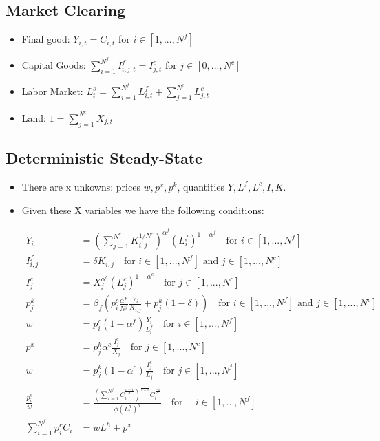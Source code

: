 \documentclass[11pt]{article}
\numberwithin{equation}{section}
\begin{document}
\subsection{Market Clearing}

\begin{itemize}
	\item Final good: $Y_{i,t} = C_{i,t}$ for $i \in [1,...,N^f]$
	\item Capital Goods: $\sum_{i=1}^{N^f} I^f_{i,j,t} = I^c_{j,t}$ for $j \in [0,...,N^c]$
	\item Labor Market: $L^s_{t}= \sum_{i=1}^{N^f} L^f_{i,t} +  \sum_{j=1}^{N^c} L^c_{j,t}$
	\item Land: $1 = \sum_{j=1}^{N^c} X_{j,t}$
\end{itemize}

\subsection{Deterministic Steady-State}
\begin{itemize}
	\item There are x unkowns: prices $w,p^x,p^k$, quantities $Y, L^f, L^c, I, K$.
	
	\item Given these X variables we have the following conditions: 
	
	\begin{align*}
Y_i & =  \left( \sum_{j=1}^{N^c } K^{1/N^c}_{i,j}\right)^{\alpha^f} \left(L_i^f\right)^{1-\alpha^f}  \quad \text{for }i \in [1,...,N^f]\\
I^f_{i,j} & = \delta K_{i,j}  \quad \text{for } i \in [1,...,N^f]  \text{ and } j \in [1,...,N^c]  \\
I^c_{j} & = X^{\alpha^c}_j \left(L^c_j\right)^{1-\alpha^c} \quad \text{for } j \in [1,...,N^c] \\ 
p^k_{j} & =\beta_f \left( p^c_{i} \frac{\alpha^F}{N^f} \frac{Y_{i}}{K_{i,j}} +  p^k_{j} (1-\delta) \right)  \quad \text{for } i \in [1,...,N^f]  \text{ and } j \in [1,...,N^c] \\
w & = p^c_{i} (1-\alpha^f) \frac{Y_{i}}{ L^f_{i}}  \quad \text{for }i \in [1,...,N^f] \\
p^x & = p^k_{j} \alpha^c \frac{I^c_{j}}{X_{j}}  \quad \text{for } j \in [1,...,N^c] \\
w & =  p^k_{j} (1-\alpha^c) \frac{I^c_{j}}{L^c_{j}}  \quad \text{for } j \in [1,...,N^j]\\
\frac{p^c_{i}}{w} & = \frac{\left( \sum_{i=1}^{N^f} C_i^{\frac{\sigma-1}{\sigma}} \right)^{\frac{1}{\sigma-1}} C_i^{\frac{-1}{\sigma}}}{\phi \left(L^h_t\right)^{\eta}} \quad \text{for } \quad i \in [1,...,N^f] \\
 \sum_{i=1}^{N^f} p^c_{i} C_{i} & =  w L^h +p^x
	\end{align*}
	
\end{itemize}
\end{document}
